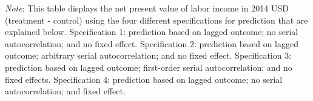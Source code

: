 \documentclass[static]{JJH-Beamer}
\begin{document}
\begin{frame}

\begin{table}[H]
\caption{Net Present Value of Labor Income and Cost/Benefit Analysis Under Different Specifications for Labor Income Predictions}\label{table:predsens}
\begin{center}
\end{center}
{\flushleft \tiny \emph{Note}: This table displays the net present value of labor income in 2014 USD (treatment - control) using the four different specifications for prediction that are explained below. Specification 1: prediction based on lagged outcome; no serial autocorrelation; and no fixed effect. Specification 2: prediction based on lagged outcome; arbitrary serial autocorrelation; and no fixed effect. Specification 3: prediction based on lagged outcome; first-order serial autocorrelation; and no fixed effects. Specification 4: prediction based on lagged outcome; no serial autocorrelation; and fixed effect. \\}
\end{table}

\end{frame}
\end{document}
